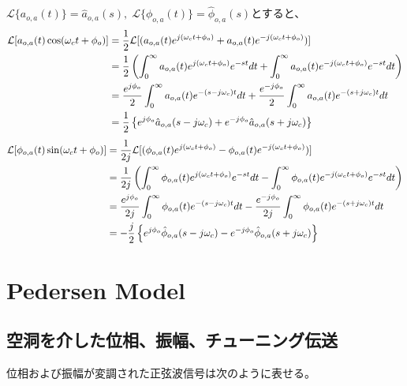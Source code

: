 \documentclass[book]{jlreq}
\begin{document}
%
$\mathcal{L}\{a_{o,a}(t)\} = \hat{a}_{o,a}(s),\; \mathcal{L}\{\phi_{o,a}(t)\} = \hat{\phi}_{o,a}(s)$とすると、
%
\begin{align}
    \mathcal{L} [a_{o,a}(t)\cos(\omega_c t+\phi_o)]
     & = \frac{1}{2}\mathcal{L}[(a_{o,a}(t) e^{j(\omega_c t+\phi_o)}+a_{o,a}(t) e^{-j(\omega_c t+\phi_o)})]\notag \\
     & = \frac{1}{2}\left(\int_0^\infty a_{o,a}(t) e^{j(\omega_c t+\phi_o)} e^{-st} dt
    + \int_0^\infty a_{o,a}(t) e^{-j(\omega_c t+\phi_o)} e^{-st} dt \right)\notag                                 \\
     & = \frac{e^{j\phi_o}}{2}\int_0^\infty a_{o,a}(t) e^{-(s-j\omega_c) t} dt
    + \frac{e^{-j\phi_o}}{2}\int_0^\infty a_{o,a}(t) e^{-(s+j\omega_c) t} dt\notag                                \\
     & = \frac{1}{2}\left\{e^{j\phi_o}\hat{a}_{o,a}(s-j\omega_c) + e^{-j\phi_o}\hat{a}_{o,a}(s+j\omega_c)\right\}
\end{align}
%
\begin{align}
    \mathcal{L} [\phi_{o,a}(t)\sin(\omega_c t+\phi_o)]
     & = \frac{1}{2j}\mathcal{L}[(\phi_{o,a}(t) e^{j(\omega_c t+\phi_o)} - \phi_{o,a}(t) e^{-j(\omega_c t+\phi_o)})]\notag \\
     & = \frac{1}{2j}\left(\int_0^\infty \phi_{o,a}(t) e^{j(\omega_c t+\phi_o)} e^{-st} dt
    - \int_0^\infty \phi_{o,a}(t) e^{-j(\omega_c t+\phi_o)} e^{-st} dt \right)\notag                                       \\
     & = \frac{e^{j\phi_o}}{2j}\int_0^\infty \phi_{o,a}(t) e^{-(s-j\omega_c) t} dt
    - \frac{e^{-j\phi_o}}{2j}\int_0^\infty \phi_{o,a}(t) e^{-(s+j\omega_c) t} dt\notag                                     \\
     & = -\frac{j}{2}\left\{e^{j\phi_o}\hat{\phi}_{o,a}(s-j\omega_c) - e^{-j\phi_o} \hat{\phi}_{o,a}(s+j\omega_c)\right\}
\end{align}

\section{Pedersen Model}
\subsection{空洞を介した位相、振幅、チューニング伝送}

位相および振幅が変調された正弦波信号は次のように表せる。
\end{document}
